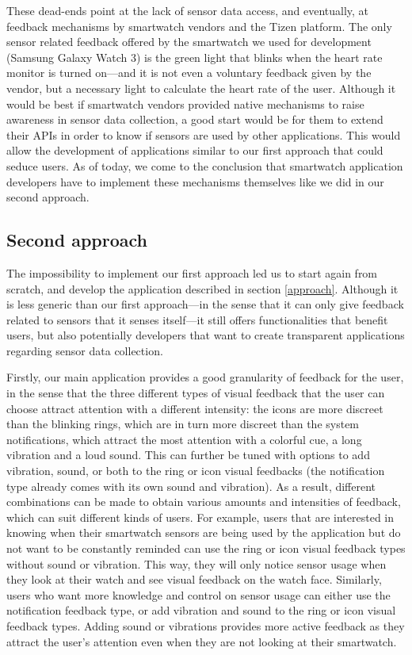 \documentclass[conference, a4paper, 10pt, twocolumn]{IEEEtran}
\begin{document}

These dead-ends point at the lack of sensor data access, and eventually, at feedback mechanisms by smartwatch vendors and the Tizen platform. The only sensor related feedback offered by the smartwatch we used for development (Samsung Galaxy Watch 3) is the green light that blinks when the heart rate monitor is turned on---and it is not even a voluntary feedback given by the vendor, but a necessary light to calculate the heart rate of the user. Although it would be best if smartwatch vendors provided native mechanisms to raise awareness in sensor data collection, a good start would be for them to extend their \acp{API} in order to know if sensors are used by other applications. This would allow the development of applications similar to our first approach that could seduce users. As of today, we come to the conclusion that smartwatch application developers have to implement these mechanisms themselves like we did in our second approach.

\subsection{Second approach}
The impossibility to implement our first approach led us to start again from scratch, and develop the application described in section \ref{approach}. Although it is less generic than our first approach---in the sense that it can only give feedback related to sensors that it senses itself---it still offers functionalities that benefit users, but also potentially developers that want to create transparent applications regarding sensor data collection.

Firstly, our main application provides a good granularity of feedback for the user, in the sense that the three different types of visual feedback that the user can choose attract attention with a different intensity: the icons are more discreet than the blinking rings, which are in turn more discreet than the system notifications, which attract the most attention with a colorful cue, a long vibration and a loud sound. This can further be tuned with options to add vibration, sound, or both to the ring or icon visual feedbacks (the notification type already comes with its own sound and vibration). As a result, different combinations can be made to obtain various amounts and intensities of feedback, which can suit different kinds of users. For example, users that are interested in knowing when their smartwatch sensors are being used by the application but do not want to be constantly reminded can use the ring or icon visual feedback types without sound or vibration. This way, they will only notice sensor usage when they look at their watch and see visual feedback on the watch face. Similarly, users who want more knowledge and control on sensor usage can either use the notification feedback type, or add vibration and sound to the ring or icon visual feedback types. Adding sound or vibrations provides more active feedback as they attract the user's attention even when they are not looking at their smartwatch. 
\end{document}
